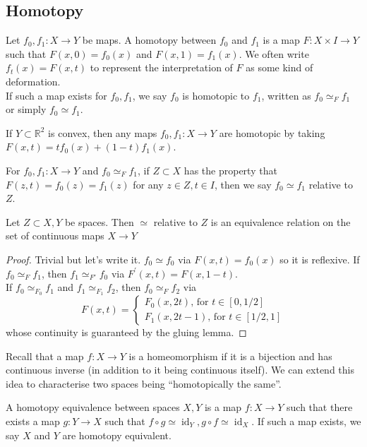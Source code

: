 \subsection{Homotopy}
\begin{definition}
    Let $f_0,f_1:X\to Y$ be maps.
    A homotopy between $f_0$ and $f_1$ is a map $F:X\times I\to Y$ such that $F(x,0)=f_0(x)$ and $F(x,1)=f_1(x)$.
    We often write $f_t(x)=F(x,t)$ to represent the interpretation of $F$ as some kind of deformation.\\
    If such a map exists for $f_0,f_1$, we say $f_0$ is homotopic to $f_1$, written as $f_0\simeq_F f_1$ or simply $f_0\simeq f_1$.
\end{definition}
\begin{example}
    If $Y\subset\mathbb R^2$ is convex, then any maps $f_0,f_1:X\to Y$ are homotopic by taking $F(x,t)=tf_0(x)+(1-t)f_1(x)$.
\end{example}
\begin{definition}
    For $f_0,f_1:X\to Y$ and $f_0\simeq_F f_1$, if $Z\subset X$ has the property that $F(z,t)=f_0(z)=f_1(z)$ for any $z\in Z,t\in I$, then we say $f_0\simeq f_1$ relative to $Z$.
\end{definition}
\begin{lemma}
    Let $Z\subset X,Y$ be spaces.
    Then $\simeq$ relative to $Z$ is an equivalence relation on the set of continuous maps $X\to Y$
\end{lemma}
\begin{proof}
    Trivial but let's write it.
    $f_0\simeq f_0$ via $F(x,t)=f_0(x)$ so it is reflexive.
    If $f_0\simeq_F f_1$, then $f_1\simeq_{F'}f_0$ via $F^\prime(x,t)=F(x,1-t)$.\\
    If $f_0\simeq_{F_0}f_1$ and $f_1\simeq_{F_1}f_2$, then $f_0\simeq_F f_2$ via
    $$F(x,t)=\begin{cases}
        F_0(x,2t)\text{, for $t\in[0,1/2]$}\\
        F_1(x,2t-1)\text{, for $t\in[1/2,1]$}
    \end{cases}$$
    whose continuity is guaranteed by the gluing lemma.
\end{proof}
Recall that a map $f:X\to Y$ is a homeomorphism if it is a bijection and has continuous inverse (in addition to it being continuous itself).
We can extend this idea to characterise two spaces being ``homotopically the same''.
\begin{definition}
    A homotopy equivalence between spaces $X,Y$ is a map $f:X\to Y$ such that there exists a map $g:Y\to X$ such that $f\circ g\simeq \operatorname{id}_Y,g\circ f\simeq\operatorname{id}_X$.
    If such a map exists, we say $X$ and $Y$ are homotopy equivalent.
\end{definition}
